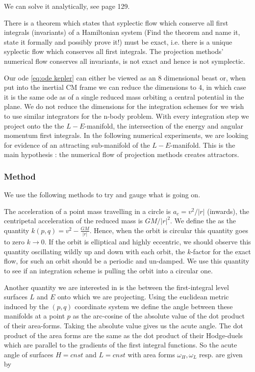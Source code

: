 \documentclass[12pt]{article}
\begin{document}
We can solve it analytically, see \cite{WBell} page 129. 

There is a theorem which states that syplectic flow which conserve all first integrals (invariants) of a Hamiltonian system (Find the theorem and name it, state it formally and possibly prove it!) must be exact, i.e. there is a unique syplectic flow which conserves all first integrals. The projection methods' numerical flow conserves all invariants, is not exact and hence is not symplectic. 


Our ode \eqref{eq:ode kepler} can either be viewed as an 8 dimensional beast or, when put into the inertial CM frame we can reduce the dimensions to 4, in which case it is the same ode as of a single reduced mass orbiting a central potential in the plane. We do not reduce the dimensions for the integration schemes for we wish to use similar integrators for the n-body problem. With every integration step we project onto the the $L-E$-manifold, the intersection of the energy and angular momentum first integrals. In the following numerical experiments, we are looking for evidence of an attracting sub-manifold of the $L-E$-manifold. This is the main hypothesis : the numerical flow of projection methods creates attractors.

\subsubsection{Method}

We use the following methods to try and gauge what is going on.

The acceleration of a point mass travelling in a circle is $a_c = v^2/|r|$ (inwards), the centripetal acceleration of the reduced mass is $GM/{|r|^2}$. We define the  as the quantity $k(p,q) = v^2 - \frac{GM}{|r|}$. Hence, when the orbit is circular this quantity goes to zero $k\to 0$. If the orbit is elliptical and highly eccentric, we should observe this quantity oscillating wildly up and down with each orbit, the $k$-factor for the exact flow, for such an orbit should be a periodic and un-damped. We use this quantity to see if an integration scheme is pulling the orbit into a circular one. 

Another quantity we are interested in is the  between the first-integral level surfaces $L$ and $E$ onto which we are projecting. Using the euclidean metric induced by the $(p,q)$ coordinate system we define the angle between these manifolds at a point $p$ as the arc-cosine of the absolute value of the dot product of their area-forms. Taking the absolute value gives us the acute angle. The dot product of the area forms are the same as the dot product of their Hodge-duels which are parallel to the gradients of the first integral functions. So the acute angle of surfaces $H=cnst$ and $L=cnst$ with area forms $\omega_H,\omega_L$ resp. are given by 
\end{document}
